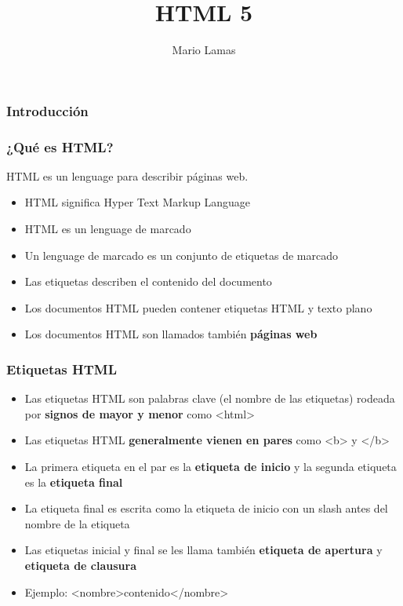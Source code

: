 \documentclass[12pt,a4paper]{beamer}
\author{Mario Lamas}
\title{HTML 5}
\date{}
\begin{document}
\begin{frame}
	\maketitle
\end{frame}

\begin{frame}
	\frametitle{Introducción}
	
\end{frame}

\begin{frame}
	\frametitle{¿Qué es HTML?}
	
	HTML es un lenguage para describir páginas web.
	\begin{itemize}
		\item HTML significa Hyper Text Markup Language \pause
		\item HTML es un lenguage de marcado \pause
		\item Un lenguage de marcado es un conjunto de etiquetas de marcado \pause
		\item Las etiquetas describen el contenido del documento \pause
		\item Los documentos HTML pueden contener etiquetas HTML y texto plano \pause
		\item Los documentos HTML son llamados también \textbf{páginas web}
	\end{itemize}
\end{frame}

\begin{frame}
	\frametitle{Etiquetas HTML}
	\begin{itemize}
		\item Las etiquetas HTML son palabras clave (el nombre de las etiquetas) rodeada por \textbf{signos de mayor y menor} como <html> \pause
		\item Las etiquetas HTML \textbf{generalmente vienen en pares} como <b> y </b> \pause
		\item La primera etiqueta en el par es la \textbf{etiqueta de inicio} y la segunda etiqueta es la \textbf{etiqueta final} \pause
		\item La etiqueta final es escrita como la etiqueta de inicio con un slash antes del nombre de la etiqueta \pause
		\item Las etiquetas inicial y final se les llama también \textbf{etiqueta de apertura} y \textbf{etiqueta de clausura} \pause
		\item Ejemplo: <nombre>contenido</nombre>
	\end{itemize}	
\end{frame}
\end{document}
